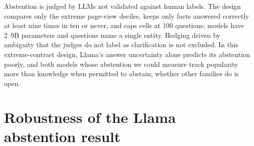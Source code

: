 \documentclass{article}
\begin{document}
Abstention is judged by LLMs not validated against human labels. The design compares only the extreme page-view deciles, keeps only facts answered correctly at least nine times in ten or never, and caps cells at 100 questions; models have 2--9B parameters and questions name a single entity. Hedging driven by ambiguity that the judges do not label as clarification is not excluded. In this extreme-contrast design, Llama's answer uncertainty alone predicts its abstention poorly, and both models whose abstention we could measure track popularity more than knowledge when permitted to abstain; whether other families do is open.




\appendix

\section{Robustness of the Llama abstention result}
\label{app:robust}
\end{document}

